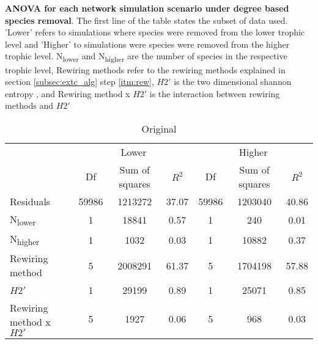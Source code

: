 \documentclass[12pt,a4paper]{article}
\begin{document}
\begin{table}[H]
\caption[ANOVA for each network simulation scenario under degree based species removal]{\textbf{ANOVA for each network simulation scenario under degree based species removal}. The first line of the table states the subset of data used. 'Lower' refers to simulations where species were removed from the lower trophic level and 'Higher' to simulations were species were removed from the higher trophic level. N\textsubscript{lower} and N\textsubscript{higher} are the number of species in the respective trophic level, Rewiring methods refer to the rewiring methods explained in section \ref{subsec:extc_alg} step \ref{itm:rew}, $H2'$ is the two dimensional shannon entropy \parencite{Bluethgen2006}, and Rewiring method x $H2'$ is the interaction between rewiring methods and $H2'$}
\label{tab:anova_by_cv_deg}
    \begin{subtable}{\linewidth}
    \caption{Original}
    \centering
\begin{tabularx}{\linewidth}{@{} X *6{c} @{}}
\toprule
  & \multicolumn{3}{c}{Lower} & \multicolumn{3}{c}{Higher} \\ \cmidrule(l){2-4} \cmidrule(l){5-7}
  						& Df		& Sum of squares	& $R^2$	& Df 	& Sum of squares	& $R^2$ \\ \midrule
Residuals 				& 59986 & 1213272			& 37.07	& 59986 & 1203040 		& 40.86   \\
N\textsubscript{lower} 	& 1 		& 18841 			& 0.57 	& 1		& 240 			& 0.01  \\
N\textsubscript{higher} 	& 1 		& 1032 			& 0.03	& 1 		& 10882 			& 0.37  \\
Rewiring method 			& 5 		& 2008291 		& 61.37	& 5 		& 1704198			& 57.88  \\
$H2'$ 					& 1 		& 29199 			& 0.89 	& 1 		& 25071			& 0.85 \\
Rewiring method x $H2'$ 	& 5 		& 1927 			& 0.06 	& 5 		& 968			& 0.03  \\ \bottomrule
\end{tabularx}
\end{subtable}


\end{table}
\end{document}
